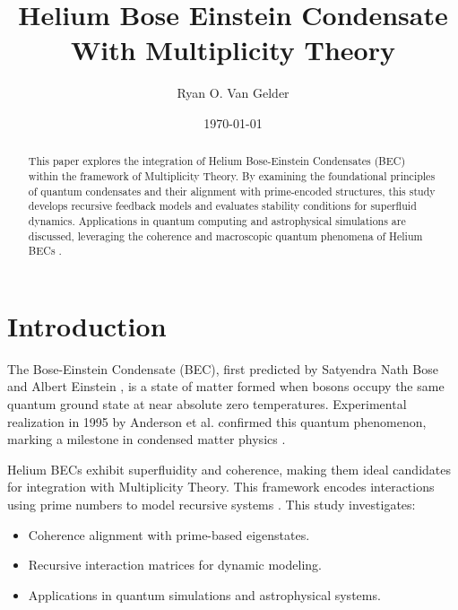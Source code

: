 \documentclass{article}
\theoremstyle{plain}
\begin{document}
\title{Helium Bose Einstein Condensate\\With Multiplicity Theory}

\author{Ryan O. Van Gelder}
\date{\today}

\maketitle

\begin{abstract}
This paper explores the integration of Helium Bose-Einstein Condensates (BEC) within the framework of Multiplicity Theory. By examining the foundational principles of quantum condensates \cite{bose1924,einstein1925} and their alignment with prime-encoded structures, this study develops recursive feedback models and evaluates stability conditions for superfluid dynamics. Applications in quantum computing and astrophysical simulations are discussed, leveraging the coherence and macroscopic quantum phenomena of Helium BECs \cite{anderson1995,greiner2002}.
\end{abstract}

\section{Introduction}
The Bose-Einstein Condensate (BEC), first predicted by Satyendra Nath Bose and Albert Einstein \cite{bose1924,einstein1925}, is a state of matter formed when bosons occupy the same quantum ground state at near absolute zero temperatures. Experimental realization in 1995 by Anderson et al. confirmed this quantum phenomenon, marking a milestone in condensed matter physics \cite{anderson1995}.

Helium BECs exhibit superfluidity and coherence, making them ideal candidates for integration with Multiplicity Theory. This framework encodes interactions using prime numbers to model recursive systems \cite{multiplicity2024}. This study investigates:
\begin{itemize}
    \item Coherence alignment with prime-based eigenstates.
    \item Recursive interaction matrices for dynamic modeling.
    \item Applications in quantum simulations and astrophysical systems.
\end{itemize}
\end{document}
